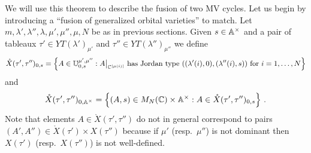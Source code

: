 \documentclass{article} %
\begin{document}
% 
We will use this theorem to describe the fusion of two MV cycles. 
% 
Let us begin by introducing a ``fusion of generalized orbital varieties'' to match. 
% 
Let $m,\lambda',\lambda'',\lambda,\mu',\mu'',\mu,N$ be as in previous sections.
% 
Given $s\in\AA^\times$ and a pair of tableaux $\tau'\in YT(\lambda')_{\mu'}$ and $\tau''\in YT(\lambda'')_{\mu''}$ we define
% 
\begin{equation*}
    \mathring X(\tau',\tau'')_{0,s} 
    = \left\{A\in\UU_{0,s}^{\mu',\mu''} : A \big|_{\CC^{|\mu(i)|}} 
    \text{ has Jordan type } ((\lambda'(i), 0), (\lambda''(i), s))
    \text{ for } i=1,\dots,N\right\}
\end{equation*}
% 
% 
and
\begin{equation*}
        \mathring X(\tau',\tau'')_{0,\AA^\times} = 
    \left\{
        (A,s)\in M_N(\CC) \times \AA^\times: 
        A \in \mathring X(\tau',\tau'')_{0,s} 
    \right\}\,.
\end{equation*}
% 
Note that elements $A\in\mathring X(\tau',\tau'')$ do not in general correspond to pairs $(A',A'')\in\mathring X(\tau')\times X(\tau'')$ because if $\mu'$ (resp.\ $\mu''$) is not dominant then $X(\tau')$ (resp.\ $X(\tau'')$) is not well-defined. 
\end{document}
